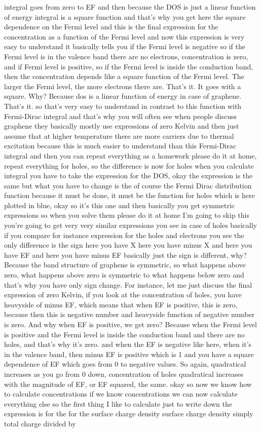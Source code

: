 integral goes from zero to EF and then because the DOS is just a linear function of energy integral is a square function and that's why you get here the square dependence on the Fermi level and this is the final expression for the concentration as a function of the Fermi level and now this expression is very easy to understand it basically tells you if the Fermi level is negative so if the Fermi level is in the valence band there are no electrons, concentration is zero, and if Fermi level is positive, so if the Fermi level is inside the conduction band, then the concentration depends like a square function of the Fermi level. The larger the Fermi level, the more electrons there are. That's it. It goes with a square. Why? Because dos is a linear function of energy in case of graphene. That's it. so that's very easy to understand in contrast to this function with Fermi-Dirac integral and that's why you will often see when people discuss graphene they basically mostly use expressions of zero Kelvin and then just assume that at higher temperature there are more carriers due to thermal excitation because this is much easier to understand than this Fermi-Dirac integral and then you can repeat everything as a homework please do it at home, repeat everything for holes, so the difference is now for holes when you calculate integral you have to take the expression for the DOS, okay the expression is the same but what you have to change is the of course the Fermi Dirac distribution function because it must be done, it must be the function for holes which is here plotted in blue, okay so it's this one and then basically you get symmetric expressions so when you solve them please do it at home I'm going to skip this you're going to get very very similar expressions you see in case of holes basically if you compare for instance expression for the holes and electrons you see the only difference is the sign here you have X here you have minus X and here you have EF and here you have minus EF basically just the sign is different, why? Because the band structure of graphene is symmetric, so what happens above zero, what happens above zero is symmetric to what happens below zero and that's why you have only sign change. For instance, let me just discuss the final expression of zero Kelvin, if you look at the concentration of holes, you have heavyside of minus EF, which means that when EF is positive, this is zero, because then this is negative number and heavyside function of negative number is zero. And why when EF is positive, we get zero? Because when the Fermi level is positive and the Fermi level is inside the conduction band and there are no holes, and that's why it's zero. and when the EF is negative like here, when it's in the valence band, then minus EF is positive which is 1 and you have a square dependence of EF which goes from 0 to negative values. So again, quadratical increases as you go from 0 down, concentration of holes quadratical increases with the magnitude of EF, or EF squared, the same. okay so now we know how to calculate concentrations if we know concentrations we can now calculate everything else so the first thing I like to calculate just to write down the expression is for the for the surface charge density surface charge density simply total charge divided by 